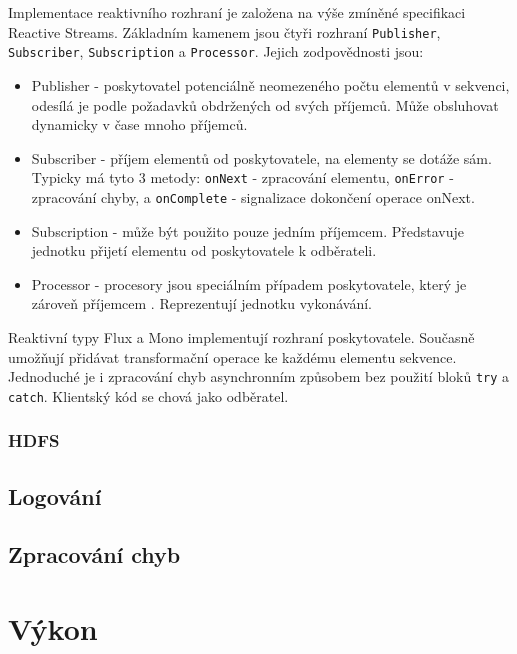 Implementace reaktivního rozhraní je založena na výše zmíněné specifikaci Reactive Streams. Základním kamenem jsou čtyři rozhraní \texttt{Publisher}, \texttt{Subscriber}, \texttt{Subscription} a \texttt{Processor}. Jejich zodpovědnosti jsou:
\begin{itemize}
    \item Publisher - poskytovatel potenciálně neomezeného počtu elementů v sekvenci, odesílá je podle požadavků obdržených od svých příjemců. Může obsluhovat dynamicky v čase mnoho příjemců.
    
    \item Subscriber - příjem elementů od poskytovatele, na elementy se dotáže sám. Typicky má tyto 3 metody: \texttt{onNext} - zpracování elementu, \texttt{onError} - zpracování chyby, a \texttt{onComplete} - signalizace dokončení operace onNext.
    
    \item Subscription - může být použito pouze jedním příjemcem. Představuje jednotku přijetí elementu od poskytovatele k odběrateli.
    
    \item Processor - procesory jsou speciálním případem poskytovatele, který je zároveň příjemcem \cite{reactoreRefGuide}. Reprezentují jednotku vykonávání.
\end{itemize}

\noindent Reaktivní typy Flux a Mono implementují rozhraní poskytovatele. Současně umožňují přidávat transformační operace ke každému elementu sekvence. Jednoduché je i zpracování chyb asynchronním způsobem bez použití bloků \texttt{try} a \texttt{catch}. Klientský kód se chová jako odběratel.

\subsection{HDFS}

\section{Logování}

\section{Zpracování chyb}

\chapter{Výkon} \label{chapter_performance}

